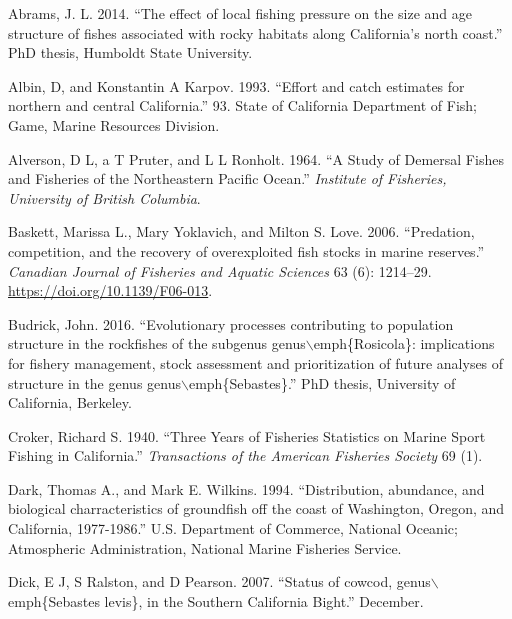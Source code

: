 \documentclass[
  english,
  a4paper,
]{article}
\newlength{\cslhangindent}
\newlength{\cslentryspacingunit} %
\newenvironment{CSLReferences}[2] %
 {%
  \setlength{\parindent}{0pt}
  \ifodd #1
  \let\oldpar\par
  \def\par{\hangindent=\cslhangindent\oldpar}
  \fi
  \setlength{\parskip}{#2\cslentryspacingunit}
 }%
 {}
\begin{document}
\hypertarget{refs}{}
\begin{CSLReferences}{1}{0}
\leavevmode{}%
Abrams, J. L. 2014. {``{The effect of local fishing pressure on the size and age structure of fishes associated with rocky habitats along California's north coast}.''} PhD thesis, Humboldt State University.

\leavevmode{}%
Albin, D, and Konstantin A Karpov. 1993. {``{Effort and catch estimates for northern and central California}.''} 93. State of California Department of Fish; Game, Marine Resources Division.

\leavevmode{}%
Alverson, D L, a T Pruter, and L L Ronholt. 1964. {``{A Study of Demersal Fishes and Fisheries of the Northeastern Pacific Ocean}.''} \emph{Institute of Fisheries, University of British Columbia}.

\leavevmode{}%
Baskett, Marissa L., Mary Yoklavich, and Milton S. Love. 2006. {``{Predation, competition, and the recovery of overexploited fish stocks in marine reserves}.''} \emph{Canadian Journal of Fisheries and Aquatic Sciences} 63 (6): 1214--29. \url{https://doi.org/10.1139/F06-013}.

\leavevmode{}%
Budrick, John. 2016. {``{Evolutionary processes contributing to population structure in the rockfishes of the subgenus genus\(\backslash\)emph{\{}Rosicola{\}}: implications for fishery management, stock assessment and prioritization of future analyses of structure in the genus genus\(\backslash\)emph{\{}Sebastes{\}}.}''} PhD thesis, University of California, Berkeley.

\leavevmode{}%
Croker, Richard S. 1940. {``{Three Years of Fisheries Statistics on Marine Sport Fishing in California}.''} \emph{Transactions of the American Fisheries Society} 69 (1).

\leavevmode{}%
Dark, Thomas A., and Mark E. Wilkins. 1994. {``{Distribution, abundance, and biological charracteristics of groundfish off the coast of Washington, Oregon, and California, 1977-1986}.''} U.S. Department of Commerce, National Oceanic; Atmospheric Administration, National Marine Fisheries Service.

\leavevmode{}%
Dick, E J, S Ralston, and D Pearson. 2007. {``{Status of cowcod, genus\(\backslash\)emph{\{}Sebastes levis{\}}, in the Southern California Bight}.''} December.


\end{CSLReferences}
\end{document}
